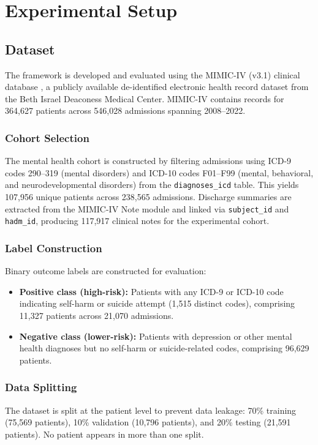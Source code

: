 \documentclass[conference]{IEEEtran}
\begin{document}
\section{Experimental Setup}

\subsection{Dataset}
The framework is developed and evaluated using the MIMIC-IV (v3.1) clinical database \cite{b14}, a publicly available de-identified electronic health record dataset from the Beth Israel Deaconess Medical Center. MIMIC-IV contains records for 364,627 patients across 546,028 admissions spanning 2008--2022.

\subsubsection{Cohort Selection}
The mental health cohort is constructed by filtering admissions using ICD-9 codes 290--319 (mental disorders) and ICD-10 codes F01--F99 (mental, behavioral, and neurodevelopmental disorders) from the \texttt{diagnoses\_icd} table. This yields 107,956 unique patients across 238,565 admissions. Discharge summaries are extracted from the MIMIC-IV Note module and linked via \texttt{subject\_id} and \texttt{hadm\_id}, producing 117,917 clinical notes for the experimental cohort.

\subsubsection{Label Construction}
Binary outcome labels are constructed for evaluation:
\begin{itemize}
\item \textbf{Positive class (high-risk):} Patients with any ICD-9 or ICD-10 code indicating self-harm or suicide attempt (1,515 distinct codes), comprising 11,327 patients across 21,070 admissions.
\item \textbf{Negative class (lower-risk):} Patients with depression or other mental health diagnoses but no self-harm or suicide-related codes, comprising 96,629 patients.
\end{itemize}

\subsubsection{Data Splitting}
The dataset is split at the patient level to prevent data leakage: 70\% training (75,569 patients), 10\% validation (10,796 patients), and 20\% testing (21,591 patients). No patient appears in more than one split.
\end{document}
